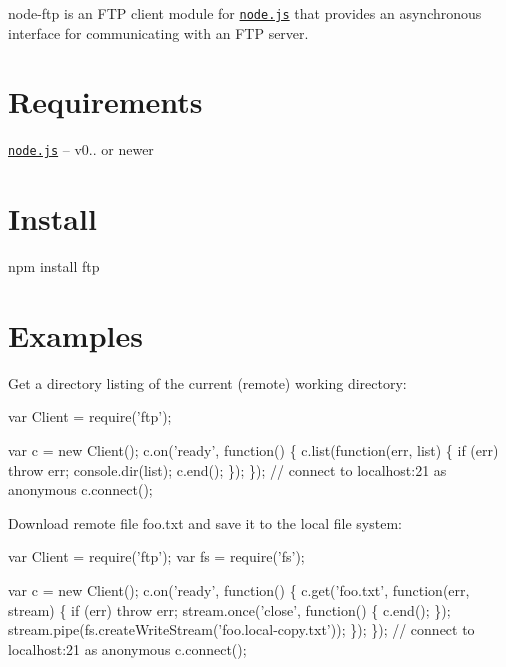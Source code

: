 node-\/ftp is an F\+TP client module for \href{http://nodejs.org/}{\tt node.\+js} that provides an asynchronous interface for communicating with an F\+TP server.

\section*{Requirements }


\begin{DoxyItemize}
\item \href{http://nodejs.org/}{\tt node.\+js} -- v0.. or newer
\end{DoxyItemize}

\section*{Install }

\begin{DoxyVerb}npm install ftp
\end{DoxyVerb}


\section*{Examples }


\begin{DoxyItemize}
\item Get a directory listing of the current (remote) working directory\+:
\end{DoxyItemize}


\begin{DoxyCode}
var Client = require('ftp');

var c = new Client();
c.on('ready', function() \{
  c.list(function(err, list) \{
    if (err) throw err;
    console.dir(list);
    c.end();
  \});
\});
// connect to localhost:21 as anonymous
c.connect();
\end{DoxyCode}



\begin{DoxyItemize}
\item Download remote file \textquotesingle{}foo.\+txt\textquotesingle{} and save it to the local file system\+:
\end{DoxyItemize}


\begin{DoxyCode}
var Client = require('ftp');
var fs = require('fs');

var c = new Client();
c.on('ready', function() \{
  c.get('foo.txt', function(err, stream) \{
    if (err) throw err;
    stream.once('close', function() \{ c.end(); \});
    stream.pipe(fs.createWriteStream('foo.local-copy.txt'));
  \});
\});
// connect to localhost:21 as anonymous
c.connect();
\end{DoxyCode}



